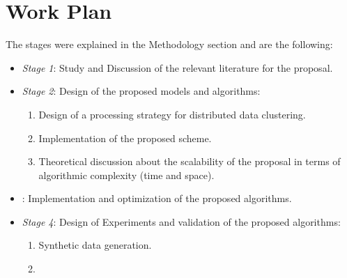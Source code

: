 \documentclass[10pt]{article}
\begin{document}
\section{Work Plan}
The stages were explained in the Methodology section and are the following:
\begin{itemize}
\item \textit{Stage 1}: %
Study and Discussion of the relevant literature for the proposal.
\item \textit{Stage 2}: %
Design of the proposed models and algorithms: 
\begin{enumerate}
\item %
Design of a processing strategy for distributed data clustering.
\item %
Implementation of the proposed scheme.
\item %
Theoretical discussion about the scalability of the proposal in terms of algorithmic complexity (time and space).
\end{enumerate}
\item {}: %
    Implementation and optimization of the proposed algorithms.
\item \textit{Stage 4}: %
    Design of Experiments and validation of the proposed algorithms: 
\begin{enumerate}
\item %
    Synthetic data generation.
\item %

\end{enumerate}
\end{itemize}
\end{document}

